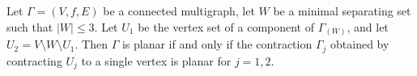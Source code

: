 Let $\Gamma = (V, f, E)$ be a connected multigraph, let $W$ be a minimal separating set such that $|W| \leq 3$. Let $U_1$ be the vertex set of a component of $\Gamma_{(W)}$, and let $U_2 = V \setminus W \setminus U_1$. Then $\Gamma$ is planar if and only if the contraction $\Gamma_j$ obtained by contracting $U_j$ to a single vertex is planar for $j = 1, 2$.
